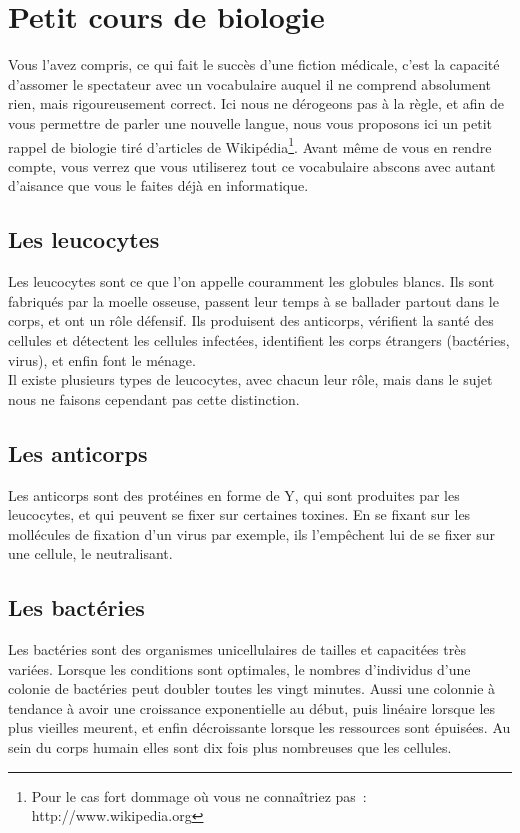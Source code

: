 
\section{Petit cours de biologie} %

Vous l'avez compris, ce qui fait le succès d'une fiction médicale,
c'est la capacité d'assomer le spectateur avec un vocabulaire auquel
il ne comprend absolument rien, mais rigoureusement correct. Ici nous
ne dérogeons pas à la règle, et afin de vous permettre de parler une
nouvelle langue, nous vous proposons ici un petit rappel de biologie
tiré d'articles de Wikipédia\footnote{Pour le cas fort dommage où vous
ne connaîtriez pas~: http://www.wikipedia.org}. Avant même de vous en
rendre compte, vous verrez que vous utiliserez tout ce vocabulaire
abscons avec autant d'aisance que vous le faites déjà en informatique.

\subsection{Les leucocytes}

Les leucocytes sont ce que l'on appelle couramment les globules
blancs. Ils sont fabriqués par la moelle osseuse, passent leur temps à
se ballader partout dans le corps, et ont un rôle défensif. Ils
produisent des anticorps, vérifient la santé des cellules et détectent
les cellules infectées, identifient les corps étrangers (bactéries,
virus), et enfin font le ménage.\\

Il existe plusieurs types de leucocytes, avec chacun leur rôle, mais
dans le sujet nous ne faisons cependant pas cette distinction.

\subsection{Les anticorps}

Les anticorps sont des protéines en forme de Y, qui sont produites par
les leucocytes, et qui peuvent se fixer sur certaines toxines. En se
fixant sur les mollécules de fixation d'un virus par exemple, ils
l'empêchent lui de se fixer sur une cellule, le neutralisant.

\subsection{Les bactéries}

Les bactéries sont des organismes unicellulaires de tailles et
capacitées très variées. Lorsque les conditions sont optimales, le
nombres d'individus d'une colonie de bactéries peut doubler toutes les
vingt minutes. Aussi une colonnie à tendance à avoir une croissance
exponentielle au début, puis linéaire lorsque les plus vieilles
meurent, et enfin décroissante lorsque les ressources sont épuisées.
Au sein du corps humain elles sont dix fois plus nombreuses que les
cellules.

